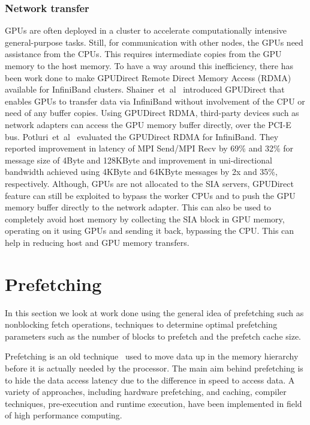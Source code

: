\subsubsection{Network transfer}
GPUs are often deployed in a cluster to accelerate computationally intensive
general-purpose tasks. Still, for communication with other nodes, the GPUs need assistance from the CPUs.
This requires intermediate copies from the GPU memory to the host memory. To have
a way around this inefficiency, there has been work done to make GPUDirect Remote
Direct Memory Access (RDMA) available for InfiniBand clusters. Shainer~et~al~\cite{Shainer2011} introduced
GPUDirect that enables GPUs to transfer data via InfiniBand without involvement
of the CPU or need of any buffer copies. Using GPUDirect RDMA, third-party devices such as
network adapters can access the GPU memory buffer directly, over the PCI-E bus.
Potluri~et~al~\cite{Potluri:2013:EIM:2570457.2571010} evaluated the GPUDirect RDMA for InfiniBand. They reported
improvement in latency of MPI Send/MPI Recv by 69\% and 32\% for message size of
4Byte and 128KByte and improvement in uni-directional bandwidth achieved using
4KByte and 64KByte messages by 2x and 35\%, respectively.
Although, GPUs are not allocated to the SIA servers, GPUDirect feature can still
be exploited to bypass the worker CPUs and to push the GPU memory buffer directly to the network
adapter. This can also be used to completely avoid host memory by collecting the
SIA block in GPU memory, operating on it using GPUs and sending it back, bypassing
the CPU. This can help in reducing host and GPU memory transfers.

\section{Prefetching}
In this section we look at work done using the general idea of prefetching such as
nonblocking fetch operations, techniques to determine optimal prefetching
parameters such as the number of blocks to prefetch and the prefetch cache size.

Prefetching is an old technique~\cite{anacker68, Smith1982, Vanderwiel2000}
used to move data up in the memory hierarchy before it is actually needed by the processor.
The main aim behind prefetching is to hide the data access latency due to the difference in speed to access
data. A variety of approaches, including hardware prefetching, and caching, compiler
techniques, pre-execution and runtime execution, have been implemented in field of
high performance computing.

